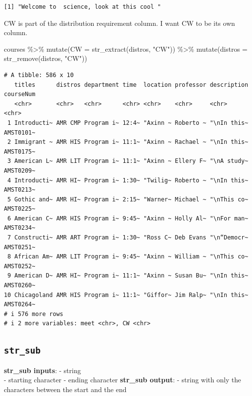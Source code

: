 \documentclass[
  letterpaper,
  DIV=11,
  numbers=noendperiod]{scrartcl}
\newenvironment{Shaded}{\begin{snugshade}}{\end{snugshade}}
\newcommand{\AttributeTok}[1]{\textcolor[rgb]{0.40,0.45,0.13}{#1}}
\newcommand{\FunctionTok}[1]{\textcolor[rgb]{0.28,0.35,0.67}{#1}}
\newcommand{\NormalTok}[1]{\textcolor[rgb]{0.00,0.23,0.31}{#1}}
\newcommand{\SpecialCharTok}[1]{\textcolor[rgb]{0.37,0.37,0.37}{#1}}
\newcommand{\StringTok}[1]{\textcolor[rgb]{0.13,0.47,0.30}{#1}}
\begin{document}
\begin{verbatim}
[1] "Welcome to  science, look at this cool "
\end{verbatim}

CW is part of the distribution requirement column. I want CW to be its
own column.

\begin{Shaded}
\begin{Highlighting}[]
\NormalTok{courses }\SpecialCharTok{\%\textgreater{}\%} 
  \FunctionTok{mutate}\NormalTok{(}\AttributeTok{CW =} \FunctionTok{str\_extract}\NormalTok{(distros, }\StringTok{"CW"}\NormalTok{)) }\SpecialCharTok{\%\textgreater{}\%} 
  \FunctionTok{mutate}\NormalTok{(}\AttributeTok{distros =} \FunctionTok{str\_remove}\NormalTok{(distros, }\StringTok{"CW"}\NormalTok{))}
\end{Highlighting}
\end{Shaded}

\begin{verbatim}
# A tibble: 586 x 10
   titles      distros department time  location professor description courseNum
   <chr>       <chr>   <chr>      <chr> <chr>    <chr>     <chr>       <chr>    
 1 Introducti~ AMR CMP Program i~ 12:4~ "Axinn ~ Roberto ~ "\nIn this~ AMST0101~
 2 Immigrant ~ AMR HIS Program i~ 11:1~ "Axinn ~ Rachael ~ "\nIn this~ AMST0175~
 3 American L~ AMR LIT Program i~ 11:1~ "Axinn ~ Ellery F~ "\nA study~ AMST0209~
 4 Introducti~ AMR HI~ Program i~ 1:30~ "Twilig~ Roberto ~ "\nIn this~ AMST0213~
 5 Gothic and~ AMR HI~ Program i~ 2:15~ "Warner~ Michael ~ "\nThis co~ AMST0225~
 6 American C~ AMR HIS Program i~ 9:45~ "Axinn ~ Holly Al~ "\nFor man~ AMST0234~
 7 Constructi~ AMR ART Program i~ 1:30~ "Ross C~ Deb Evans "\n“Democr~ AMST0251~
 8 African Am~ AMR LIT Program i~ 9:45~ "Axinn ~ William ~ "\nThis co~ AMST0252~
 9 American D~ AMR HI~ Program i~ 11:1~ "Axinn ~ Susan Bu~ "\nIn this~ AMST0260~
10 Chicagoland AMR HIS Program i~ 11:1~ "Giffor~ Jim Ralp~ "\nIn this~ AMST0264~
# i 576 more rows
# i 2 more variables: meet <chr>, CW <chr>
\end{verbatim}

\hypertarget{str_sub}{%
\subsection{\texorpdfstring{\texttt{str\_sub}}{str\_sub}}\label{str_sub}}

\textbf{str\_sub inputs}: - string\\
- starting character - ending character \textbf{str\_sub output}: -
string with only the characters between the start and the end
\end{document}
